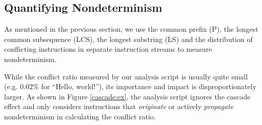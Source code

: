 \subsection{Quantifying Nondeterminism} \label{alt:stats}
As mentioned in the previous section, we use the 
common prefix (P), the longest common subsequence (LCS),
the longest substring (LS) and the distribution of
conflicting instructions in separate instruction
streams to measure nondeterminism.

\noindent While the conflict ratio measured by our analysis script is usually quite small (e.g. $0.02\%$
for ``Hello, world!''), its importance and impact is disproportionately larger.
As shown in Figure \ref{cascade:ex},  the analysis script 
ignores the cascade effect and only considers instructions that {\em originate} or actively {\em propagate}
nondeterminism in calculating the conflict ratio. 

